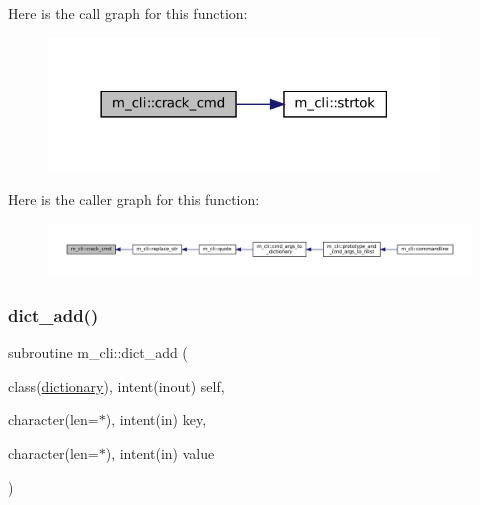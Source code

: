 Here is the call graph for this function\+:\nopagebreak
\begin{figure}[H]
\begin{center}
\leavevmode
\includegraphics[width=294pt]{namespacem__cli_a8d5d1954aac6494e07fb11f12f635c85_cgraph}
\end{center}
\end{figure}
Here is the caller graph for this function\+:\nopagebreak
\begin{figure}[H]
\begin{center}
\leavevmode
\includegraphics[width=350pt]{namespacem__cli_a8d5d1954aac6494e07fb11f12f635c85_icgraph}
\end{center}
\end{figure}
\mbox{\label{namespacem__cli_a1be098e2b920e8d50ed14be03a3133db}} 
\subsubsection{\texorpdfstring{dict\+\_\+add()}{dict\_add()}}
{\footnotesize\ttfamily subroutine m\+\_\+cli\+::dict\+\_\+add (\begin{DoxyParamCaption}\item[{class(\mbox{\hyperlink{structm__cli_1_1dictionary}{dictionary}}), intent(inout)}]{self,  }\item[{character(len=$\ast$), intent(in)}]{key,  }\item[{character(len=$\ast$), intent(in)}]{value }\end{DoxyParamCaption})\hspace{0.3cm}{\ttfamily [private]}}

\mbox{\label{namespacem__cli_aff32e44070983c7fb4eb0a3b1dea7a6d}} 
